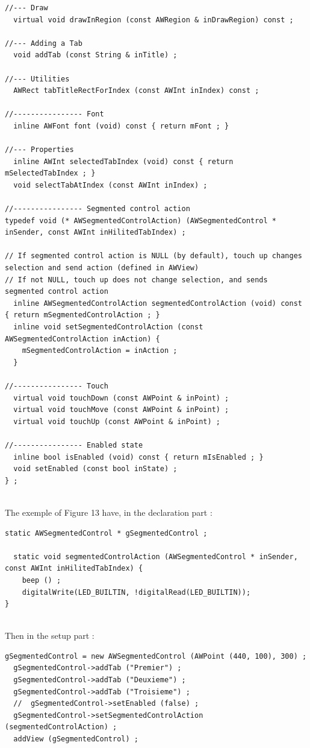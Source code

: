 \documentclass[a4paper,11pt]{extarticle}
\begin{document}
\begin{lstlisting}[language=Arduinonl]
//--- Draw
  virtual void drawInRegion (const AWRegion & inDrawRegion) const ;

//--- Adding a Tab
  void addTab (const String & inTitle) ;

//--- Utilities
  AWRect tabTitleRectForIndex (const AWInt inIndex) const ;

//---------------- Font
  inline AWFont font (void) const { return mFont ; }

//--- Properties
  inline AWInt selectedTabIndex (void) const { return mSelectedTabIndex ; }
  void selectTabAtIndex (const AWInt inIndex) ;

//---------------- Segmented control action
typedef void (* AWSegmentedControlAction) (AWSegmentedControl * inSender, const AWInt inHilitedTabIndex) ;

// If segmented control action is NULL (by default), touch up changes selection and send action (defined in AWView)
// If not NULL, touch up does not change selection, and sends segmented control action
  inline AWSegmentedControlAction segmentedControlAction (void) const { return mSegmentedControlAction ; }
  inline void setSegmentedControlAction (const AWSegmentedControlAction inAction) {
    mSegmentedControlAction = inAction ;
  }

//---------------- Touch
  virtual void touchDown (const AWPoint & inPoint) ;
  virtual void touchMove (const AWPoint & inPoint) ;
  virtual void touchUp (const AWPoint & inPoint) ;

//---------------- Enabled state
  inline bool isEnabled (void) const { return mIsEnabled ; }
  void setEnabled (const bool inState) ;
} ;
\end{lstlisting}

~\\ The exemple of Figure 13 have, in the declaration part :

\begin{lstlisting}[language=Arduinonl]
  static AWSegmentedControl * gSegmentedControl ;
  
  static void segmentedControlAction (AWSegmentedControl * inSender, const AWInt inHilitedTabIndex) {
    beep () ;
    digitalWrite(LED_BUILTIN, !digitalRead(LED_BUILTIN));
}
\end{lstlisting}

~\\ Then in the setup part :

\begin{lstlisting}[language=Arduinonl]
  gSegmentedControl = new AWSegmentedControl (AWPoint (440, 100), 300) ;
  gSegmentedControl->addTab ("Premier") ;
  gSegmentedControl->addTab ("Deuxieme") ;
  gSegmentedControl->addTab ("Troisieme") ;
  //  gSegmentedControl->setEnabled (false) ;
  gSegmentedControl->setSegmentedControlAction (segmentedControlAction) ;
  addView (gSegmentedControl) ;
\end{lstlisting}
\end{document}
